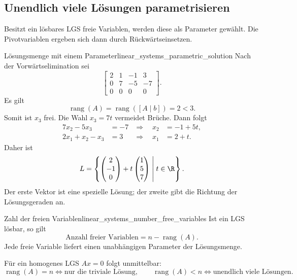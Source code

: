 \subsection{Unendlich viele Lösungen parametrisieren}
\label{subsec:linear_systems_parametric_solution_sets}

Besitzt ein lösbares LGS freie Variablen, werden diese als Parameter gewählt.
Die Pivotvariablen ergeben sich dann durch Rückwärtseinsetzen.

\begin{ExampleBox}{Lösungsmenge mit einem Parameter}{linear_systems_parametric_solution}
  Nach der Vorwärtselimination sei
  \[
    \left[
      \begin{array}{rrr|r}
        2&1&-1& 3\\
        0&7&-5&-7\\
        0&0& 0& 0
      \end{array}
    \right].
  \]
  Es gilt
  \[
    \operatorname{rang}(A)=\operatorname{rang}([A\mid b])=2<3.
  \]
  Somit ist $x_3$ frei. Die Wahl $x_3=7t$ vermeidet Brüche. Dann folgt
  \begin{align*}
    7x_2-5x_3&=-7
      &\Longrightarrow\quad x_2&=-1+5t,\\
    2x_1+x_2-x_3&=3
      &\Longrightarrow\quad x_1&=2+t.
  \end{align*}
  Daher ist
  \[
    L=
    \left\{
      \begin{pmatrix}2\\-1\\0\end{pmatrix}
      +t\begin{pmatrix}1\\5\\7\end{pmatrix}
      \;\middle|\;t\in\R
    \right\}.
  \]
  Der erste Vektor ist eine spezielle Lösung; der zweite gibt die Richtung der
  Lösungsgeraden an.
\end{ExampleBox}

\begin{KeyPointBox}{Zahl der freien Variablen}{linear_systems_number_free_variables}
  Ist ein LGS lösbar, so gilt
  \[
    \boxed{\text{Anzahl freier Variablen}
      =n-\operatorname{rang}(A)}.
  \]
  Jede freie Variable liefert einen unabhängigen Parameter der Lösungsmenge.
\end{KeyPointBox}

Für ein homogenes LGS $Ax=0$ folgt unmittelbar:
\[
  \operatorname{rang}(A)=n
    \Longleftrightarrow \text{nur die triviale Lösung},
  \qquad
  \operatorname{rang}(A)<n
    \Longleftrightarrow \text{unendlich viele Lösungen}.
\]
